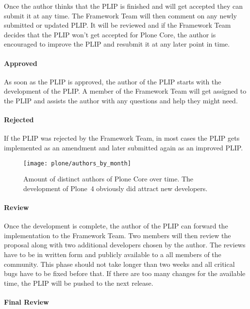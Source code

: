 Once the author thinks that the \ac{PLIP} is finished and will get accepted
they can submit it at any time. The Framework Team will then comment on any
newly submitted or updated \ac{PLIP}. It will be reviewed and if the Framework
Team decides that the \ac{PLIP} won't get accepted for Plone Core, the author
is encouraged to improve the \ac{PLIP} and resubmit it at any later point in
time.

\paragraph{Approved}

As soon as the \ac{PLIP} is approved, the author of the \ac{PLIP} starts with
the development of the \ac{PLIP}. A member of the Framework Team will get
assigned to the \ac{PLIP} and assists the author with any questions and help
they might need.

\paragraph{Rejected}

If the \ac{PLIP} was rejected by the Framework Team, in most cases the
\ac{PLIP} gets implemented as an amendment and later submitted again as an
improved \ac{PLIP}.

\begin{figure}[hbtp]
  \centering
  \texttt{[image: plone/authors\_by\_month]}
  \caption[Authors by Month, Plone]
  {Amount of distinct authors of Plone Core over time. The development of
    Plone~4 obviously did attract new developers.}
\end{figure}

\paragraph{Review}

Once the development is complete, the author of the \ac{PLIP} can forward the
implementation to the Framework Team. Two members will then review the proposal
along with two additional developers chosen by the author. The reviews have to
be in written form and publicly available to a all members of the community.
This phase should not take longer than two weeks and all critical bugs have to
be fixed before that. If there are too many changes for the available time, the
\ac{PLIP} will be pushed to the next release.

\paragraph{Final Review}

